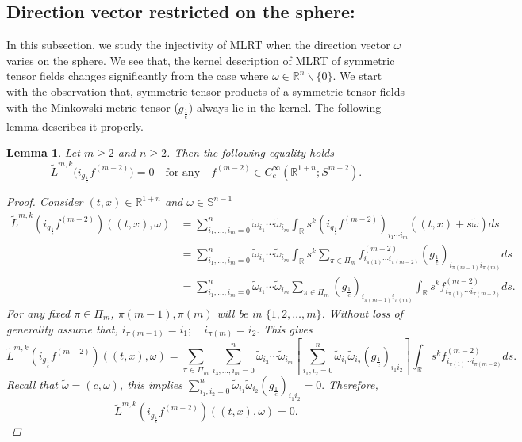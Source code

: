 \documentclass[11pt,a4paper,reqno]{amsart}
\newcommand{\qum}[1]{\quad\mbox{#1}}
\newtheorem{lemma}[definition]{Lemma}
\newcommand{\R}{\mathbb{R}}
\renewcommand{\S}{\mathbb{S}}
\newcommand{\om}{\omega}
\begin{document}
	\subsection{Direction vector restricted on the sphere:}\label{Sub-section3.2}
	In this subsection, we study the injectivity of MLRT when the direction vector $\om$ varies on the sphere. We see that, the kernel description of MLRT of symmetric tensor fields changes significantly from the case where $\om \in \R^{n}\backslash \{0 \}$. We start with the observation that, symmetric tensor products of a symmetric tensor fields with the Minkowski metric tensor ($g_\frac{1}{c}$) always lie in the kernel. The following lemma describes it properly.
	\begin{lemma}\label{backward}
	Let $m\ge 2$ and $n\ge 2$. 	 Then the following equality holds
		\[  
		\tilde{L}^{m,k}\Big(i_{g_{\frac{1}{c}}}f^{(m-2)}\Big)=0 \qum{for any} \quad f^{(m-2)}\in C_c^{\infty}(\R^{1
			+n};S^{m-2}).
		\]
		\begin{proof}
			Consider $(t,x) \in \R^{1+n}$ and $\om \in \S^{n-1}$
			\begin{equation}
				\begin{split}
					\tilde{L}^{m,k}(i_{g_\frac{1}{c}}f^{(m-2)})((t,x),\om) &=\sum_{i_1,\dots , i_m=0}^{n}\tilde{\om}_{i_1}\cdots \tilde{\om}_{i_m}\int_{\R}s^k (i_{g_{\frac{1}{c}}}
					f^{(m-2)})_{i_1\cdots i_m}((t,x)+s\tilde{\om})ds\\
					& =\sum_{i_1,\dots , i_m=0}^{n}\tilde{\om}_{i_1}\cdots \tilde{\om}_{i_m}\int_{\R}s^k \sum_{\pi \in \Pi_{m}} f^{(m-2)}_{i_{\pi(1)}\cdots i_{\pi(m-2)}}(g_{\frac{1}{c}})_{i_{\pi(m-1)}i_{\pi(m)}}ds\\
					&=\sum_{i_1,\dots , i_m=0}^{n}\tilde{\om}_{i_1}\cdots \tilde{\om}_{i_m} \sum_{\pi \in \Pi_{m}}(g_{\frac{1}{c}})_{i_{\pi(m-1)}i_{\pi(m)}}\int_{\R}s^kf^{(m-2)}_{i_{\pi(1)}\cdots i_{\pi(m-2)}}ds.
				\end{split}
			\end{equation}
			For any fixed $\pi \in \Pi_m$, $\pi(m-1), \pi(m)$ will be in $\{1,2,\dots,m\}$. Without loss of generality assume that, $	i_{\pi(m-1)}=i_1;\quad i_{\pi(m)}=i_2.$ This gives
			\[
			\tilde{L}^{m,k}(i_{g_\frac{1}{c}}f^{(m-2)})((t,x),\om) =\sum_{\pi \in \Pi_m}\sum_{i_3,\dots , i_m=0}^{n}\tilde{\om}_{i_3}\cdots \tilde{\om}_{i_m}[\sum_{i_1,i_2=0}^{n}\tilde{\om}_{i_1}\tilde{\om}_{i_2}(g_{\frac{1}{c}})_{i_1i_2}]\int_{\R}s^kf^{(m-2)}_{i_{\pi(1)}\cdots i_{\pi(m-2)}}ds.
			\]
			Recall that $\tilde{\omega}=(c, \omega)$, this implies  $\sum_{i_1,i_2=0}^{n}\tilde{\om}_{i_1}\tilde{\om}_{i_2}(g_{\frac{1}{c}})_{i_1i_2}=0.$ Therefore, 
            \[\tilde{L}^{m,k}(i_{g_\frac{1}{c}}f^{(m-2)})((t,x),\om) =0.\] 
		\end{proof}
	\end{lemma}
\end{document}
